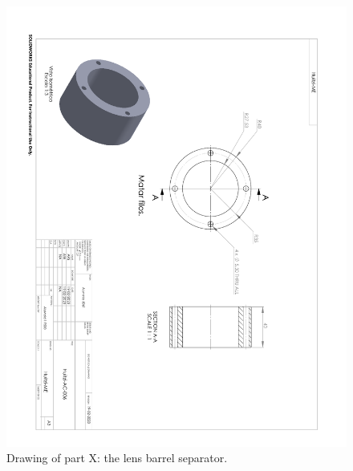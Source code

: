 \begin{figure}
\begin{center}
\includegraphics[angle=180,width=0.9\linewidth]{figures/huitzi-f20-part-X.pdf}
\end{center}
\caption{Drawing of part X: the lens barrel separator.}
\label{figure:huitzi-f20-part-X}
\end{figure}

